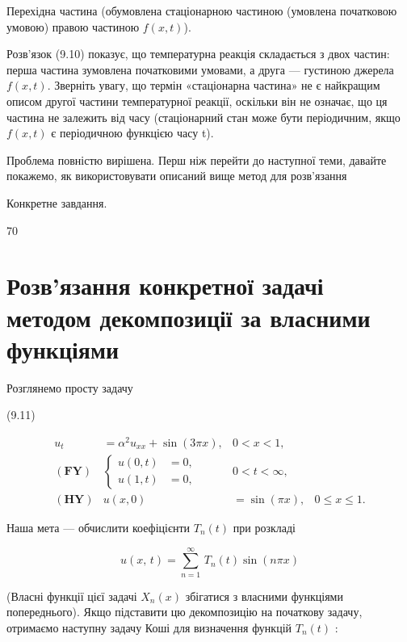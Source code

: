 \documentclass[
  ukrainian,
]{article}
\begin{document}
Перехідна частина (обумовлена стаціонарною частиною (умовлена початковою
умовою) правою частиною \(f(x, t)\)).

Розв'язок (9.10) показує, що температурна реакція складається з двох
частин: перша частина зумовлена початковими умовами, а друга ---
густиною джерела \(f(x,t)\). Зверніть увагу, що термін «стаціонарна
частина» не є найкращим описом другої частини температурної реакції,
оскільки він не означає, що ця частина не залежить від часу
(стаціонарний стан може бути періодичним, якщо \(f(x, t)\) є періодичною
функцією часу t).

Проблема повністю вирішена. Перш ніж перейти до наступної теми, давайте
покажемо, як використовувати описаний вище метод для розв'язання

Конкретне завдання.

70

\section{Розв'язання конкретної задачі методом декомпозиції за власними
функціями}\label{ux440ux43eux437ux432ux44fux437ux430ux43dux43dux44f-ux43aux43eux43dux43aux440ux435ux442ux43dux43eux457-ux437ux430ux434ux430ux447ux456-ux43cux435ux442ux43eux434ux43eux43c-ux434ux435ux43aux43eux43cux43fux43eux437ux438ux446ux456ux457-ux437ux430-ux432ux43bux430ux441ux43dux438ux43cux438-ux444ux443ux43dux43aux446ux456ux44fux43cux438}

Розглянемо просту задачу

(9.11)

\[
\begin{aligned} u_t &= \alpha^2 u_{xx} + \sin{(3\pi x)}, & 0 < x < 1, \\ (\mathbf{FY}) & \begin{cases} u(0, t) &= 0, \\ u(1, t) &= 0, \end{cases} & 0 < t < \infty, \\ (\mathbf{HY}) & u(x, 0) &= \sin{(\pi x)}, & 0 \leq x \leq 1. \end{aligned}
\]

Наша мета --- обчислити коефіцієнти \(T_n(t)\) при розкладі

\[
u\left(x,\,t\right)=\sum_{n=1}^{\infty}\,T_{n}\left(t\right)\sin\left(n\pi x\right)
\]

(Власні функції цієї задачі \(X_n(x)\) збігатися з власними функціями
попереднього). Якщо підставити цю декомпозицію на початкову задачу,
отримаємо наступну задачу Коші для визначення функцій \(T_n(t)\) :
\end{document}
